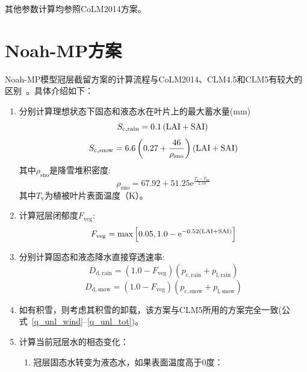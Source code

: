 其他参数计算均参照CoLM2014方案。


\section{Noah-MP方案}
Noah-MP模型冠层截留方案的计算流程与CoLM2014、CLM4.5和CLM5有较大的区别~\citep{niu2011community,he2023modernizing}。具体介绍如下：
\begin{enumerate}
  \item 分别计算理想状态下固态和液态水在叶片上的最大蓄水量(mm)\\
    \begin{equation}
      S_{\mathrm{c,rain}}=0.1\left({\rm LAI}+{\rm SAI}\right)\\
    \end{equation}
    \begin{equation}
      S_{\mathrm{c,snow}}= 6.6\left(0.27+{\frac{46}{\rho_{\mathrm{sno}}}}\right) \left({\rm LAI}+{\rm SAI}\right)
    \end{equation}
    其中$\rho_{\mathrm{sno}}$是降雪堆积密度:
    \begin{equation}
      \rho_{\mathrm{sno}}=67.92+51.25 {\mathrm e}^{\frac{T_{\mathrm{v}}-T_{\mathrm{frz}}}{2.59}}
    \end{equation}
其中$T_{\mathrm{v}}$为植被叶片表面温度（K）。
  \item 计算冠层闭郁度$F_{\mathrm{veg}}$:
    \begin{equation}
      F_{\mathrm{veg}} = \max\left[0.05,1.0-{\mathrm e}^{-0.52\left({\rm LAI}+{\rm SAI}\right)}\right]
    \end{equation}
  \item 分别计算固态和液态降水直接穿透速率:
    \begin{equation}
      D_{\mathrm{d,rain}}=\left(1.0-F_{\mathrm{veg}}\right)  (p_{\mathrm{c,rain}}+p_{\mathrm{l,rain}})
    \end{equation}
    \begin{equation}
      D_{\mathrm{d,snow}}=\left(1.0-F_{\mathrm{veg}}\right)  (p_{\mathrm{c,snow}}+p_{\mathrm{l,snow}})
    \end{equation}
  \item 如有积雪，则考虑其积雪的卸载，该方案与CLM5所用的方案完全一致(公式~\eqref{q_unl_wind}--\eqref{q_unl_tot})。
  \item 计算当前冠层水的相态变化：
    \begin{enumerate}
      \item 冠层固态水转变为液态水，如果表面温度高于0度：
        \begin{equation}

\end{equation}
\end{enumerate}
\end{enumerate}
